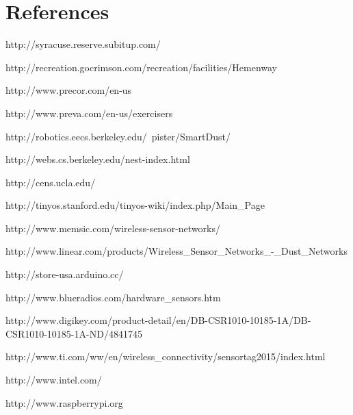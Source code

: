 \documentclass[ppfs.tex]{template/subfiles}
\begin{document}
\section{References}

\renewcommand{\section}[2]{} %

\begin{thebibliography}{}


http://syracuse.reserve.subitup.com/

http://recreation.gocrimson.com/recreation/facilities/Hemenway

http://www.precor.com/en-us

http://www.preva.com/en-us/exercisers

http://robotics.eecs.berkeley.edu/~pister/SmartDust/

http://webs.cs.berkeley.edu/nest-index.html

http://cens.ucla.edu/

http://tinyos.stanford.edu/tinyos-wiki/index.php/Main\_Page

http://www.memsic.com/wireless-sensor-networks/

http://www.linear.com/products/Wireless\_Sensor\_Networks\_-\_Dust\_Networks

http://store-usa.arduino.cc/

http://www.blueradios.com/hardware\_sensors.htm

http://www.digikey.com/product-detail/en/DB-CSR1010-10185-1A/DB-CSR1010-10185-1A-ND/4841745

http://www.ti.com/ww/en/wireless\_connectivity/sensortag2015/index.html

http://www.intel.com/

http://www.raspberrypi.org


\end{thebibliography}
\end{document}

